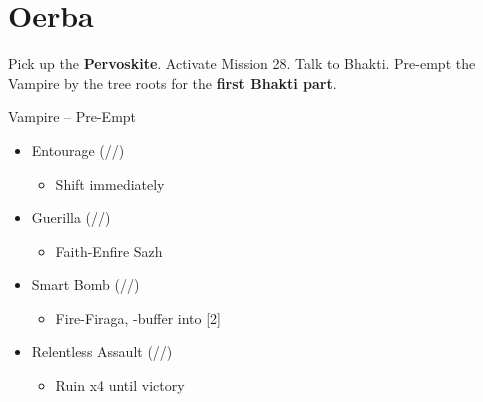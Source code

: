 \chapter{Oerba}

\renewcommand{\first}{[1] Guerilla (\syn/\rav/\sab)}
\renewcommand{\second}{[2] Relentless Assault (\com/\rav/\rav)}
\renewcommand{\third}{[3] Entourage (\rav/\sen/\med)}
\renewcommand{\fourth}{[4] Solidarity (\com/\sen/\med)}
\renewcommand{\fifth}{[5] Smart Bomb (\rav/\rav/\sab)}
\renewcommand{\sixth}{[6] Diversity (\com/\rav/\med)}

Pick up the \textbf{Pervoskite}.
Activate Mission 28.
Talk to Bhakti.
Pre-empt the Vampire by the tree roots for the \textbf{first Bhakti part}.

\begin{battle}{Vampire -- Pre-Empt}
	\begin{itemize}
		\item \third
			\begin{itemize}
				\item Shift immediately
			\end{itemize}
		\item \first
			\begin{itemize}
				\item Faith-Enfire Sazh
			\end{itemize}
		\item \fifth
			\begin{itemize}
				\item Fire-Firaga, \com-buffer into [2]
			\end{itemize}
		\item \second
			\begin{itemize}
				\item Ruin x4 until victory
			\end{itemize}
	\end{itemize}
\end{battle}

